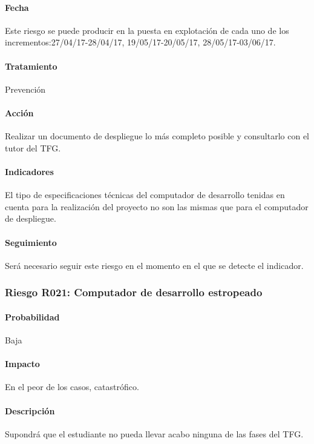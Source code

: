 \documentclass[10pt,a4paper]{article}
\begin{document}
				\paragraph{Fecha} Este riesgo se puede producir en la puesta en explotación de cada uno de los incrementos:27/04/17-28/04/17, 19/05/17-20/05/17, 28/05/17-03/06/17. %
				\paragraph{Tratamiento} Prevención %
				\paragraph{Acción} Realizar un documento de despliegue lo más completo posible y consultarlo con el tutor del TFG. %
				\paragraph{Indicadores} El tipo de  especificaciones técnicas del computador de desarrollo tenidas en cuenta para la realización del proyecto no son las mismas que para el computador de despliegue.  %
				\paragraph{Seguimiento}	Será necesario seguir este riesgo en el momento en el que se detecte el indicador.%
				
			\subsubsection{Riesgo R021: Computador de desarrollo estropeado }
				\paragraph{Probabilidad} Baja
				\paragraph{Impacto}	En el peor de los casos, catastrófico.
				\paragraph{Descripción} Supondrá que el estudiante no pueda llevar acabo ninguna de las fases del TFG.
\end{document}
